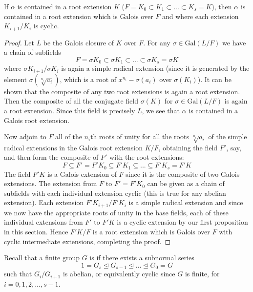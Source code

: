 \documentclass[12pt, a4paper, oneside, openright, titlepage]{book}
\begin{document}
\begin{lem}
    If $\alpha$ is contained in a root extension $K$ ($F = K_0 \subset K_1 \subset ... \subset K_s = K$), then $\alpha$ is contained in a root extension which is Galois over $F$ and where each extension $K_{i+1}/K_i$ is cyclic.
\end{lem}
\begin{proof}
    Let $L$ be the Galois closure of $K$ over $F$. For any $\sigma \in \text{Gal}(L/F)$ we have a chain of subfields \begin{equation*}
        F = \sigma K_0 \subset \sigma K_1 \subset ... \subset \sigma K_s = \sigma K
    \end{equation*}
    where $\sigma K_{i+1}/\sigma K_i$ is again a simple radical extension (since it is generated by the element $\sigma(\sqrt[n_i]{a_i})$, which is a root of $x^{n_i}-\sigma(a_i)$ over $\sigma(K_i)$). It can be shown that the composite of any two root extensions is again a root extension. Then the composite of all the conjugate field $\sigma(K)$ for $\sigma \in \text{Gal}(L/F)$ is again a root extension. Since this field is precisely $L$, we see that $\alpha$ is contained in a Galois root extension.

    Now adjoin to $F$ all of the $n_i$th roots of unity for all the roots $\sqrt[n_i]{a_i}$ of the simple radical extensions in the Galois root extension $K/F$, obtaining the field $F'$, say, and then form the composite of $F'$ with the root extensions: \begin{equation*}
        F \subseteq F' = F'K_0 \subseteq F'K_1 \subseteq ... \subseteq  F'K_s = F'K
    \end{equation*}
    The field $F'K$ is a Galois extension of $F$ since it is the composite of two Galois extensions. The extension from $F$ to $F' = F'K_0$ can be given as a chain of subfields with each individual extension cyclic (this is true for any abelian extension). Each extension $F'K_{i+1}/F'K_i$ is a simple radical extension and since we now have the appropriate roots of unity in the base fields, each of these individual extensions from $F'$ to $F'K$ is a cyclic extension by our first proposition in this section. Hence $F'K/F$ is a root extension which is Galois over $F$ with cyclic intermediate extensions, completing the proof.
\end{proof}

Recall that a finite group $G$ is  if there exists a subnormal series \begin{equation*}
    1 = G_s \trianglelefteq G_{s-1} \trianglelefteq ... \trianglelefteq G_0 = G
\end{equation*}
such that $G_{i}/G_{i+1}$ is abelian, or equivalently cyclic since $G$ is finite, for $i = 0,1,2,...,s-1$.
\end{document}
